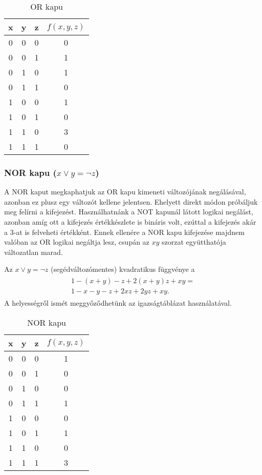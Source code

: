 	\begin{table}[ht]
	\footnotesize
	\centering
	\begin{tabular}{ c c c c }
		\toprule
		x & y & z & $f(x,y,z)$ \\
		\midrule
		0 & 0 & 0 & 0 \\
		0 & 0 & 1 & 1 \\
		0 & 1 & 0 & 1 \\
		0 & 1 & 1 & 0 \\
		1 & 0 & 0 & 1 \\
		1 & 0 & 1 & 0 \\
		1 & 1 & 0 & 3 \\
		1 & 1 & 1 & 0 \\		
		\bottomrule
	\end{tabular}
	\caption{OR kapu}
	\label{tab:ORgate}
\end{table}


\subsubsection{NOR kapu ($x \vee y = \neg z$)}

A NOR kaput megkaphatjuk az OR kapu kimeneti változójának negálásával, azonban ez plusz egy változót kellene jelentsen. Ehelyett direkt módon próbáljuk meg felírni a kifejezést. Használhatnánk a NOT kapunál látott logikai negálást, azonban amíg ott a kifejezés értékkészlete is bináris volt, ezúttal a kifejezés akár a $3$-at is felveheti értékként. Ennek ellenére a NOR kapu kifejezése majdnem valóban az OR logikai negáltja lesz, csupán az $xy$ szorzat együtthatója változatlan marad.

\begin{allitas}
	Az $x \vee y = \neg z$ (segédváltozómentes) kvadratikus függvénye a 
	\begin{align}
	\begin{split}
		1-(x+y)-z+2(x+y)z+xy = \\
		 1-x-y-z+2xz+2yz+xy.
	\end{split}
	\end{align}	
	A helyességről ismét meggyőződhetünk az igazságtáblázat használatával.
\end{allitas}

\begin{table}[ht]
	\footnotesize
	\centering
	\begin{tabular}{ c c c c }
		\toprule
		x & y & z & $f(x,y,z)$ \\
		\midrule
		0 & 0 & 0 & 1 \\
		0 & 0 & 1 & 0 \\
		0 & 1 & 0 & 0 \\
		0 & 1 & 1 & 1 \\
		1 & 0 & 0 & 0 \\
		1 & 0 & 1 & 1 \\
		1 & 1 & 0 & 0 \\
		1 & 1 & 1 & 3 \\		
		\bottomrule
	\end{tabular}
	\caption{NOR kapu}
	\label{tab:NORgate}
\end{table}

